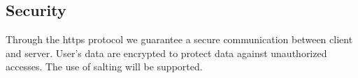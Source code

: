 \subsection{Security}
Through the https protocol we guarantee a secure communication between client and server.
User’s data are encrypted to protect data against unauthorized accesses. The use of salting will be supported.
